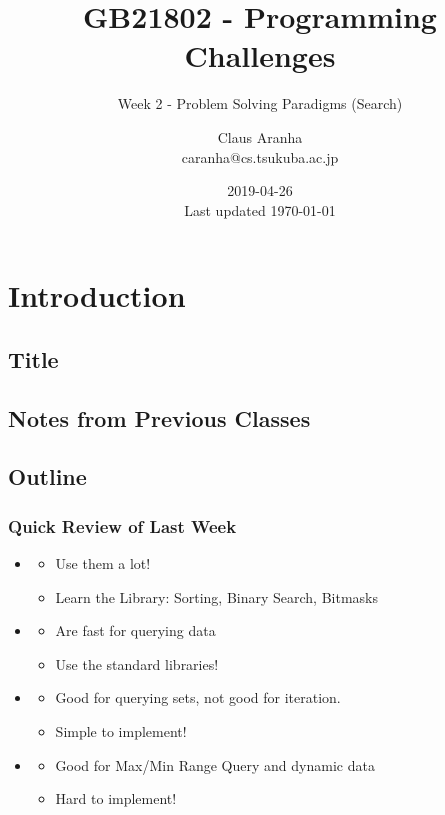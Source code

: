\documentclass{beamer}
\title[GB21802]{GB21802 - Programming Challenges}
\subtitle[]{Week 2 - Problem Solving Paradigms (Search)}
\author[Claus Aranha]{Claus Aranha\\{\footnotesize caranha@cs.tsukuba.ac.jp}}
\institute{College of Information Science}
\date{2019-04-26\\{\tiny Last updated \today}}
\begin{document}
\section{Introduction}
\subsection{Title}
\begin{frame}
\maketitle
\end{frame}

\subsection{Notes from Previous Classes}



\subsection{Outline}

\begin{frame}
  \frametitle{Quick Review of Last Week}
  \begin{itemize}
  \item {}
    \begin{itemize}
    \item Use them a lot!
    \item Learn the Library: Sorting, Binary Search, Bitmasks
    \end{itemize}

    \medskip

  \item {}
    \begin{itemize}
    \item Are fast for querying data
    \item Use the standard libraries!
    \end{itemize}

    \medskip

  \item {}
    \begin{itemize}
    \item Good for querying sets, not good for iteration.
    \item Simple to implement!
    \end{itemize}

    \medskip

  \item {}
    \begin{itemize}
    \item Good for Max/Min Range Query and dynamic data
    \item Hard to implement!
    \end{itemize}
  \end{itemize}
\end{frame}
\end{document}

